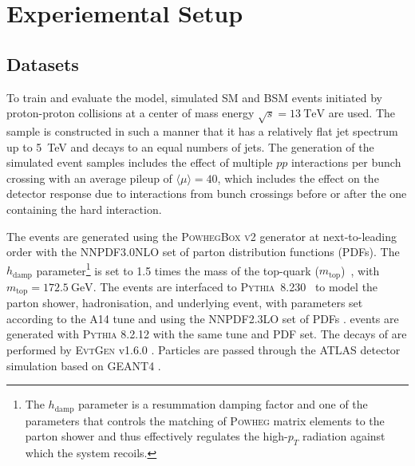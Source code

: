 \section{Experiemental Setup}\label{sec:experimental_setup}

\subsection{Datasets}\label{sec:datasets}

To train and evaluate the model, simulated SM \ttbar and BSM \Zprime events initiated by proton-proton collisions at a center of mass energy $\sqrt{s} = \SI{13}{\TeV}$ are used.
The \Zprime sample is constructed in such a manner that it has a relatively flat jet \pt spectrum up to \SI{5}{\TeV} and decays to an equal numbers of \bcl jets.
The generation of the simulated event samples includes the effect of multiple $pp$ interactions per bunch crossing with an average pileup of $\langle \mu \rangle = 40$, which includes the effect on the detector response due to interactions from bunch crossings before or after the one containing the hard interaction.

\newcommand{\hdampFootnote}{%
The $h_\text{damp}$ parameter is a resummation damping factor and one of the parameters that controls the matching of \textsc{Powheg} matrix elements to the parton shower and thus effectively regulates the high-$p_T$ radiation against which the \ttbar system recoils.}

The \ttbar events are generated using the \textsc{PowhegBox} \cite{powheg2004, powheg2007, powheg2007_2, powheg2010} \textsc{v2} generator at next-to-leading order with the NNPDF3.0NLO \cite{Ball:2014uwa} set of parton distribution functions (PDFs). The $h_\text{damp}$ parameter\footnote{\hdampFootnote} is set to 1.5 times the mass of the top-quark ($m_\text{top}$)~\cite{ATL-PHYS-PUB-2016-020}, with $m_\text{top} = \SI{172.5}{\GeV}$. 
The events are interfaced to \textsc{Pythia}~8.230~\cite{Sjostrand:2014zea} to model the parton shower, hadronisation, and underlying event, with parameters set according to the A14 tune \cite{ATL-PHYS-PUB-2014-021} and using the NNPDF2.3LO set of PDFs \cite{Ball:2012cx}. 
\Zprime events are generated with \textsc{Pythia} 8.2.12 with the same tune and PDF set.
The decays of \bchadrons are performed by \textsc{EvtGen} v1.6.0 \cite{Lange:2001uf}.
Particles are passed through the ATLAS detector simulation \cite{SOFT-2010-01} based on GEANT4 \cite{Agostinelli:2002hh}.

